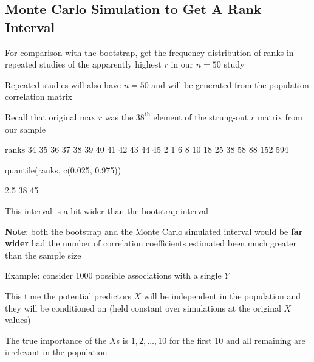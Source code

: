 \subsection{Monte Carlo Simulation to Get A Rank Interval}
\bi
\item For comparison with the bootstrap, get the frequency distribution of ranks in repeated studies of the apparently highest $r$ in our $n=50$ study
\item Repeated studies will also have $n=50$ and will be generated from the population correlation matrix
\item Recall that original max $r$ was the $38^\textrm{th}$ element of the strung-out $r$ matrix from our sample
\begin{Schunk}
\begin{Soutput}
ranks
 34  35  36  37  38  39  40  41  42  43  44  45 
  2   1   6   8  10  18  25  38  58  88 152 594 
\end{Soutput}
\begin{Sinput}
quantile(ranks, c(0.025, 0.975))
\end{Sinput}
\begin{Soutput}
 2.5%
   38    45 
\end{Soutput}
\end{Schunk}
\item This interval is a bit wider than the bootstrap interval
\item \textbf{Note}: both the bootstrap and the Monte Carlo simulated interval would be \textbf{far wider} had the number of correlation coefficients estimated been much greater than the sample size
\item Example: consider 1000 possible associations with a single $Y$
\item This time the potential predictors $X$ will be independent in the population and they will be conditioned on (held constant over simulations at the original $X$ values)
\item The true importance of the $X$s is $1, 2, \ldots, 10$ for the first 10 and all remaining are irrelevant in the population
